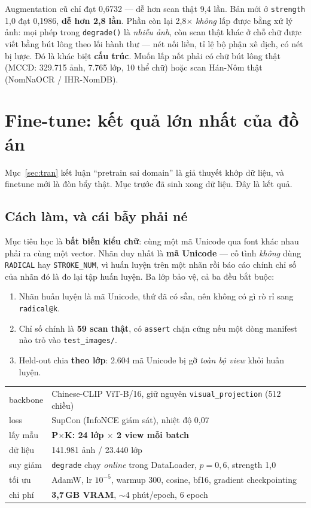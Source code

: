 \documentclass[11pt,a4paper]{article}
\newcommand{\code}[1]{\texttt{#1}}
\begin{document}
Augmentation cũ chỉ đạt 0,6732 --- dễ hơn scan thật 9,4 lần. Bản mới ở \code{strength} 1,0 đạt
0,1986, \textbf{dễ hơn 2,8 lần}. Phần còn lại 2,8$\times$ \emph{không} lấp được bằng xử lý ảnh: mọi
phép trong \code{degrade()} là \emph{nhiễu ảnh}, còn scan thật khác ở chỗ chữ được viết bằng bút
lông theo lối hành thư --- nét nối liền, tỉ lệ bộ phận xê dịch, có nét bị lược. Đó là khác biệt
\textbf{cấu trúc}. Muốn lấp nốt phải có chữ bút lông thật (MCCD: 329.715 ảnh, 7.765 lớp, 10 thể
chữ) hoặc scan Hán-Nôm thật (NomNaOCR / IHR-NomDB).

\section{Fine-tune: kết quả lớn nhất của đồ án}
\label{sec:ft}

Mục~\ref{sec:tran} kết luận ``pretrain sai domain'' là giả thuyết khớp dữ liệu, và finetune mới là
đòn bẩy thật. Mục trước đã sinh xong dữ liệu. Đây là kết quả.

\subsection{Cách làm, và cái bẫy phải né}

Mục tiêu học là \textbf{bất biến kiểu chữ}: cùng một mã Unicode qua font khác nhau phải ra cùng một
vector. Nhãn duy nhất là \textbf{mã Unicode} --- cố tình \emph{không} dùng \code{RADICAL} hay
\code{STROKE\_NUM}, vì huấn luyện trên một nhãn rồi báo cáo chính chỉ số của nhãn đó là đo lại tập
huấn luyện. Ba lớp bảo vệ, cả ba đều bắt buộc:

\begin{enumerate}
  \item Nhãn huấn luyện là mã Unicode, thứ đã có sẵn, nên không có gì rò rỉ sang \code{radical@k}.
  \item Chỉ số chính là \textbf{59 scan thật}, có \code{assert} chặn cứng nếu một dòng manifest nào
        trỏ vào \code{test\_images/}.
  \item Held-out chia \textbf{theo lớp}: 2.604 mã Unicode bị gỡ \emph{toàn bộ view} khỏi huấn luyện.
\end{enumerate}

\begin{center}
\begin{tabular}{ll}
\toprule
backbone & Chinese-CLIP ViT-B/16, giữ nguyên \code{visual\_projection} (512 chiều) \\
loss & SupCon (InfoNCE giám sát), nhiệt độ 0,07 \\
lấy mẫu & \textbf{P$\times$K: 24 lớp $\times$ 2 view mỗi batch} \\
dữ liệu & 141.981 ảnh / 23.440 lớp \\
suy giảm & \code{degrade} chạy \emph{online} trong DataLoader, $p = 0{,}6$, strength 1,0 \\
tối ưu & AdamW, lr $10^{-5}$, warmup 300, cosine, bf16, gradient checkpointing \\
chi phí & \textbf{3,7\,GB VRAM}, $\sim$4 phút/epoch, 6 epoch \\
\bottomrule
\end{tabular}
\end{center}
\end{document}
